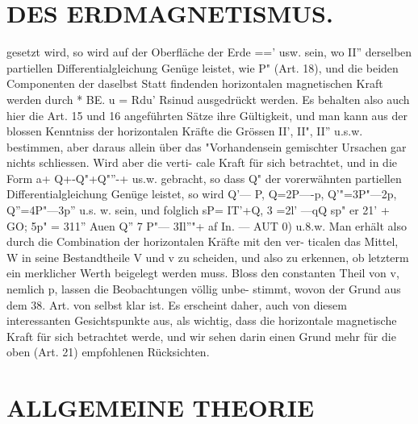 \documentclass[12pt,a4paper]{article}
\begin{document}
\section*{DES ERDMAGNETISMUS.}
gesetzt wird, so wird auf der Oberfläche der Erde ==' usw. sein, wo II'' derselben partiellen Differentialgleichung Genüge leistet, wie P" (Art. 18), und die beiden Componenten der daselbst Statt findenden horizontalen magnetischen Kraft werden durch * BE. u = Rdu' Rsinud ausgedrückt werden. Es behalten also auch hier die Art. 15 und 16 angeführten Sätze ihre Gültigkeit, und man kann aus der blossen Kenntniss der horizontalen Kräfte die Grössen II', II", II'' u.s.w. bestimmen, aber daraus allein über das "Vorhandensein gemischter Ursachen gar nichts schliessen. Wird aber die verti- cale Kraft für sich betrachtet, und in die Form a+ Q+-Q"+Q"''-+ us.w. gebracht, so dass Q" der vorerwähnten partiellen Differentialgleichung Genüge leistet, so wird Q'--- P\textdegree{}, Q=2P----p, Q'"=3P"---2p, Q''=4P"---3p'' u.s. w. sein, und folglich sP= IT'+Q, 3 =2l' ---qQ sp" er 21' + GO; 5p" = 311'' Auen Q'' 7 P"--- 3Il''"+ af In. --- AUT 0) u.8.w. Man erhält also durch die Combination der horizontalen Kräfte mit den ver- ticalen das Mittel, W in seine Bestandtheile V und v\guillemotright{} zu scheiden, und also zu erkennen, ob letzterm ein merklicher Werth beigelegt werden muss. Bloss den constanten Theil von v, nemlich p\textdegree{}, lassen die Beobachtungen völlig unbe- stimmt, wovon der Grund aus dem 38. Art. von selbst klar ist. Es erscheint daher, auch von diesem interessanten Gesichtspunkte aus, als wichtig, dass die horizontale magnetische Kraft für sich betrachtet werde, und wir sehen darin einen Grund mehr für die oben (Art. 21) empfohlenen Rücksichten.


\newpage


\section*{ALLGEMEINE THEORIE}
\end{document}

